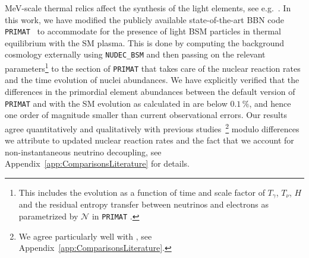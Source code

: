 \documentclass[notitlepage,letterpaper,natbib,aps,prd,onecolumn,amsmath,amsfonts,nofootinbib,preprintnumbers,superscriptaddress,secnumarabic,groupedaddress]{revtex4-1}
\begin{document}
MeV-scale thermal relics affect the synthesis of the light elements, see e.g.~\cite{Kolb:1986nf,Serpico:2004nm,Boehm:2013jpa,Nollett:2013pwa,Nollett:2014lwa}. In this work, we have modified the publicly available state-of-the-art BBN code \texttt{PRIMAT}~\cite{Pitrou:2018cgg} to accommodate for the presence of light BSM particles in thermal equilibrium with the SM plasma. This is done by computing the background cosmology externally using \texttt{NUDEC\_BSM} \cite{Escudero:2018mvt,Escudero:2019new} and then passing on the relevant parameters\footnote{This includes the evolution as a function of time and scale factor of $T_\gamma$, $T_\nu$, $H$ and the residual entropy transfer between neutrinos and electrons as parametrized by $\mathcal{N}$ in \texttt{PRIMAT} \cite{Pitrou:2018cgg}.} to the section of \texttt{PRIMAT} that takes care of the nuclear reaction rates and the time evolution of nuclei abundances. We have explicitly verified that the differences in the primordial element abundances between the default version of \texttt{PRIMAT} and with the SM evolution as calculated in \cite{Escudero:2018mvt,Escudero:2019new} are below $0.1\,\%$, and hence one order of magnitude smaller than current observational errors. Our results agree quantitatively and qualitatively with previous studies~\cite{Kolb:1986nf,Serpico:2004nm,Boehm:2013jpa,Nollett:2013pwa,Nollett:2014lwa}\footnote{We agree particularly well with \cite{Nollett:2013pwa,Nollett:2014lwa}, see Appendix~\ref{app:ComparisonsLiterature}. } modulo differences we attribute to updated nuclear reaction rates and the fact that we account for non-instantaneous neutrino decoupling, see Appendix~\ref{app:ComparisonsLiterature} for details.
\end{document}
